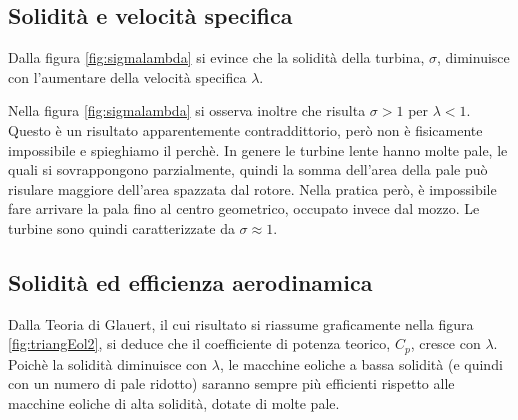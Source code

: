 \subsection{Solidità e velocità specifica}
Dalla figura \ref{fig:sigmalambda} si evince che la solidità della turbina, $\sigma$, diminuisce con l'aumentare della velocità specifica $\lambda$. 

Nella figura \ref{fig:sigmalambda} si osserva inoltre che risulta $\sigma > 1$ per $\lambda < 1$. Questo è un risultato apparentemente contraddittorio, però non è fisicamente impossibile e spieghiamo il perchè. In genere le turbine lente hanno molte pale, le quali si sovrappongono parzialmente, quindi la somma dell'area della pale può risulare maggiore dell'area spazzata dal rotore. Nella pratica però, è impossibile fare arrivare la pala fino al centro geometrico, occupato invece dal mozzo. Le turbine sono quindi caratterizzate da $\sigma \approx 1$. 

\subsection{Solidità ed efficienza aerodinamica}
Dalla Teoria di Glauert, il cui risultato si riassume graficamente nella figura \ref{fig:triangEol2}, si deduce che il coefficiente di potenza teorico, $C_p$, cresce con $\lambda$. Poichè la solidità diminuisce con $\lambda$, le macchine eoliche a bassa solidità (e quindi con un numero di pale ridotto) saranno sempre più efficienti rispetto alle macchine eoliche di alta solidità, dotate di molte pale. 

